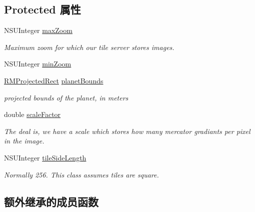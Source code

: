 \subsection*{Protected 属性}
\begin{DoxyCompactItemize}
\item 
N\-S\-U\-Integer \hyperlink{interface_r_m_fractal_tile_projection_af46f235f561d62545f4c299cb22284ff}{max\-Zoom}
\begin{DoxyCompactList}\small\item\em Maximum zoom for which our tile server stores images. \end{DoxyCompactList}\item 
N\-S\-U\-Integer \hyperlink{interface_r_m_fractal_tile_projection_a17ca1a6850b0adc8c1838a88322e8cb6}{min\-Zoom}
\item 
\hyperlink{struct_r_m_projected_rect}{R\-M\-Projected\-Rect} \hyperlink{interface_r_m_fractal_tile_projection_a5f3e841cee4a8573bfc60a6ec8a35884}{planet\-Bounds}
\begin{DoxyCompactList}\small\item\em projected bounds of the planet, in meters \end{DoxyCompactList}\item 
double \hyperlink{interface_r_m_fractal_tile_projection_a297753455c83bc2d681dad601fb7a9c5}{scale\-Factor}
\begin{DoxyCompactList}\small\item\em The deal is, we have a scale which stores how many mercator gradiants per pixel in the image. \end{DoxyCompactList}\item 
N\-S\-U\-Integer \hyperlink{interface_r_m_fractal_tile_projection_ad84192b0999b267f8fbccd827eeab01e}{tile\-Side\-Length}
\begin{DoxyCompactList}\small\item\em Normally 256. This class assumes tiles are square. \end{DoxyCompactList}\end{DoxyCompactItemize}
\subsection*{额外继承的成员函数}


